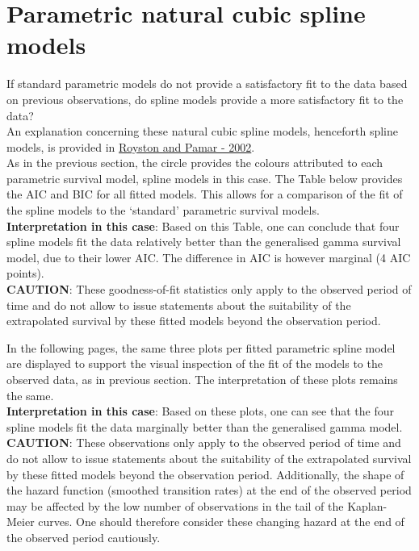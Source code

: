 \documentclass[]{article}
\begin{document}
\newpage

\section{Parametric natural cubic spline
models}\label{parametric-natural-cubic-spline-models}

If standard parametric models do not provide a satisfactory fit to the
data based on previous observations, do spline models provide a more
satisfactory fit to the data?\\
An explanation concerning these natural cubic spline models, henceforth
spline models, is provided in
\href{https://doi.org/10.1002/sim.1203}{Royston and Pamar - 2002}.\\
As in the previous section, the circle provides the colours attributed
to each parametric survival model, spline models in this case. The Table
below provides the AIC and BIC for all fitted models. This allows for a
comparison of the fit of the spline models to the `standard' parametric
survival models.\\
\textbf{Interpretation in this case}: Based on this Table, one can
conclude that four spline models fit the data relatively better than the
generalised gamma survival model, due to their lower AIC. The difference
in AIC is however marginal (4 AIC points).\\
\textbf{CAUTION}: These goodness-of-fit statistics only apply to the
observed period of time and do not allow to issue statements about the
suitability of the extrapolated survival by these fitted models beyond
the observation period.

In the following pages, the same three plots per fitted parametric
spline model are displayed to support the visual inspection of the fit
of the models to the observed data, as in previous section. The
interpretation of these plots remains the same.\\
\textbf{Interpretation in this case}: Based on these plots, one can see
that the four spline models fit the data marginally better than the
generalised gamma model.\\
\textbf{CAUTION}: These observations only apply to the observed period
of time and do not allow to issue statements about the suitability of
the extrapolated survival by these fitted models beyond the observation
period. Additionally, the shape of the hazard function (smoothed
transition rates) at the end of the observed period may be affected by
the low number of observations in the tail of the Kaplan-Meier curves.
One should therefore consider these changing hazard at the end of the
observed period cautiously.
\end{document}
